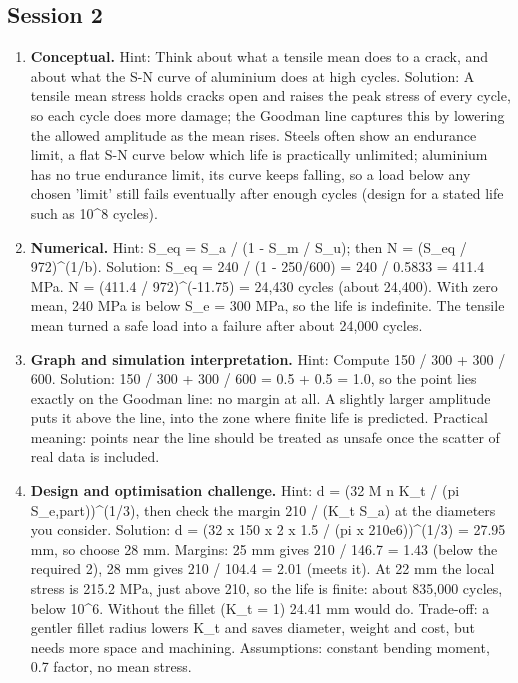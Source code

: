 \documentclass[11pt,a4paper]{article}
\begin{document}
\subsection*{Session 2}
\begin{enumerate}[nosep]
\item \textbf{Conceptual.} Hint: Think about what a tensile mean does to a crack, and about what the S-N curve of aluminium does at high cycles. Solution: A tensile mean stress holds cracks open and raises the peak stress of every cycle, so each cycle does more damage; the Goodman line captures this by lowering the allowed amplitude as the mean rises. Steels often show an endurance limit, a flat S-N curve below which life is practically unlimited; aluminium has no true endurance limit, its curve keeps falling, so a load below any chosen 'limit' still fails eventually after enough cycles (design for a stated life such as 10\textasciicircum{}8 cycles).
\item \textbf{Numerical.} Hint: S\_eq = S\_a / (1 - S\_m / S\_u); then N = (S\_eq / 972)\textasciicircum{}(1/b). Solution: S\_eq = 240 / (1 - 250/600) = 240 / 0.5833 = 411.4 MPa. N = (411.4 / 972)\textasciicircum{}(-11.75) = 24,430 cycles (about 24,400). With zero mean, 240 MPa is below S\_e = 300 MPa, so the life is indefinite. The tensile mean turned a safe load into a failure after about 24,000 cycles.
\item \textbf{Graph and simulation interpretation.} Hint: Compute 150 / 300 + 300 / 600. Solution: 150 / 300 + 300 / 600 = 0.5 + 0.5 = 1.0, so the point lies exactly on the Goodman line: no margin at all. A slightly larger amplitude puts it above the line, into the zone where finite life is predicted. Practical meaning: points near the line should be treated as unsafe once the scatter of real data is included.
\item \textbf{Design and optimisation challenge.} Hint: d = (32 M n K\_t / (pi S\_e,part))\textasciicircum{}(1/3), then check the margin 210 / (K\_t S\_a) at the diameters you consider. Solution: d = (32 x 150 x 2 x 1.5 / (pi x 210e6))\textasciicircum{}(1/3) = 27.95 mm, so choose 28 mm. Margins: 25 mm gives 210 / 146.7 = 1.43 (below the required 2), 28 mm gives 210 / 104.4 = 2.01 (meets it). At 22 mm the local stress is 215.2 MPa, just above 210, so the life is finite: about 835,000 cycles, below 10\textasciicircum{}6. Without the fillet (K\_t = 1) 24.41 mm would do. Trade-off: a gentler fillet radius lowers K\_t and saves diameter, weight and cost, but needs more space and machining. Assumptions: constant bending moment, 0.7 factor, no mean stress.
\end{enumerate}
\end{document}
